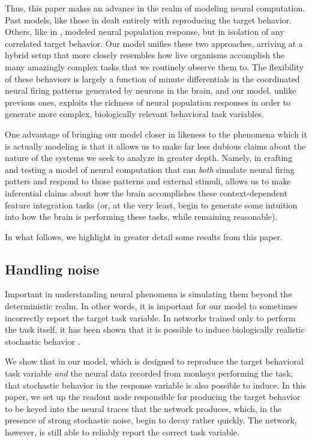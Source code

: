 \documentclass[12pt,a4paper,final]{iopart}
\begin{document}
Thus, this paper makes an advance in the realm of modeling neural computation. Past models, like those in \cite{Mante2013} dealt entirely with reproducing the target behavior. Others, like in \cite{Rajan}, modeled neural population response, but in isolation of any correlated target behavior. Our model unifies these two approaches, arriving at a hybrid setup that more closely resembles how live organisms accomplish the many amazingly complex tasks that we routinely observe them to. The flexibility of these behaviors is largely a function of minute differentials in the coordinated neural firing patterns generated by neurons in the brain, and our model, unlike previous ones, exploits the richness of neural population responses in order to generate more complex, biologically relevant behavioral task variables.

One advantage of bringing our model closer in likeness to the phenomena which it is actually modeling is that it allows us to make far less dubious claims about the nature of the systems we seek to analyze in greater depth. Namely, in crafting and testing a model of neural computation that can \emph{both} simulate neural firing patters and respond to those patterns and external stimuli, allows us to make inferential claims about how the brain accomplishes these context-dependent feature integration tasks (or, at the very least, begin to generate some intuition into how the brain is performing these tasks, while remaining reasonable). 

In what follows, we highlight in greater detail some results from this paper.

\subsection{Handling noise}
Important in understanding neural phenomena is simulating them beyond the deterministic realm. In other words, it is important for our model to sometimes incorrectly report the target task variable. In networks trained only to perform the task itself, it has been shown that it is possible to induce biologically realistic stochastic behavior \cite{CohenLol, Mante2013}. 

We show that in our model, which is designed to reproduce the target behavioral task variable \emph{and} the neural data recorded from monkeys performing the task, that stochastic behavior in the response variable is also possible to induce. In this paper, we set up the readout node responsible for producing the target behavior to be keyed into the neural traces that the network produces, which, in the presence of strong stochastic noise, begin to decay rather quickly. The network, however, is still able to reliably report the correct task variable. 
\end{document}
